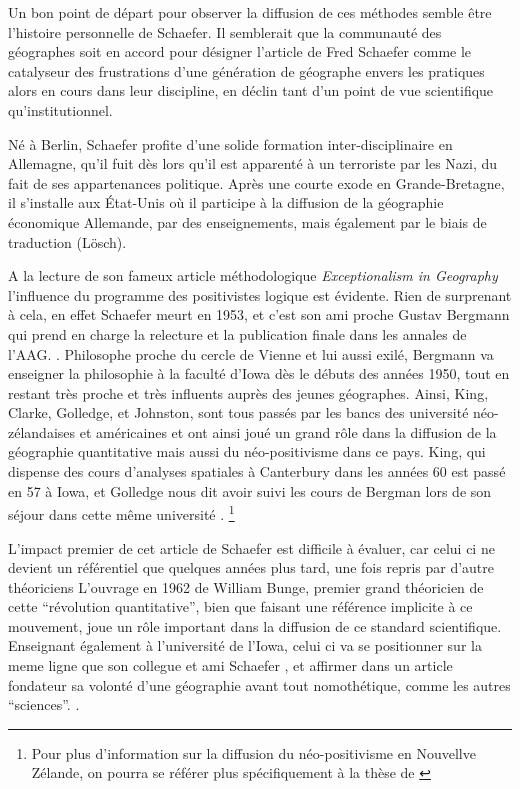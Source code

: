 Un bon point de départ pour observer la diffusion de ces méthodes semble être l'histoire personnelle de Schaefer. Il semblerait que la communauté des géographes soit en accord \autocite[15]{Louail2010} pour désigner l'article de Fred Schaefer \autocite{Schaefer1953} comme le catalyseur des frustrations d'une génération de géographe envers les pratiques alors en cours dans leur discipline, en déclin tant d'un point de vue scientifique qu’institutionnel.

Né à Berlin, Schaefer profite d'une solide formation inter-disciplinaire en Allemagne, qu'il fuit dès lors qu'il est apparenté à un terroriste par les Nazi, du fait de ses appartenances politique. Après une courte exode en Grande-Bretagne, il s'installe aux État-Unis où il participe à la diffusion de la géographie économique Allemande, par des enseignements, mais également par le biais de traduction (Lösch). \autocite{Bunge1979}

A la lecture de son fameux article méthodologique \textit{Exceptionalism in Geography} l'influence du programme des positivistes logique est évidente. Rien de surprenant à cela, en effet Schaefer meurt en 1953, et c'est son ami proche Gustav Bergmann qui prend en charge la relecture et la publication finale dans les annales de l'AAG. \autocite[32]{Gregory1978}. Philosophe proche du cercle de Vienne et lui aussi exilé, Bergmann va enseigner la philosophie à la faculté d'Iowa dès le débuts des années 1950, tout en restant très proche et très influents auprès des jeunes géographes.\autocite[192]{Buttimer1983} Ainsi, King, Clarke, Golledge, et Johnston, sont tous passés par les bancs des université néo-zélandaises et américaines et ont ainsi joué un grand rôle dans la diffusion de la géographie quantitative mais aussi du néo-positivisme dans ce pays. King, qui dispense des cours d'analyses spatiales à Canterbury dans les années 60 est passé en 57 à Iowa, et Golledge nous dit avoir suivi les cours de Bergman lors de son séjour dans cette même université \autocite[95-96]{Bailly2000}. \footnote{Pour plus d'information sur la diffusion du néo-positivisme en Nouvellve Zélande, on pourra se référer plus spécifiquement à la thèse de \textcite{Hammond1992}}

L'impact premier de cet article de Schaefer est difficile à évaluer, car celui ci ne devient un référentiel que quelques années plus tard, une fois repris par d'autre théoriciens \autocite[32]{Gregory1978} L'ouvrage en 1962 de William Bunge, premier grand théoricien de cette \enquote{révolution quantitative}, bien que faisant une référence implicite à ce mouvement, joue un rôle important dans la diffusion de ce standard scientifique. Enseignant également à l'université de l'Iowa, celui ci va se positionner sur la meme ligne que son collegue et ami Schaefer \autocite{Goodchild2001}, et affirmer dans un article fondateur \autocite{Bunge1962} sa volonté d'une géographie avant tout nomothétique, comme les autres \enquote{sciences}. \autocite{Bunge1979} \autocite{Claval2003} \autocite[429-430]{Gregory2009}. 

